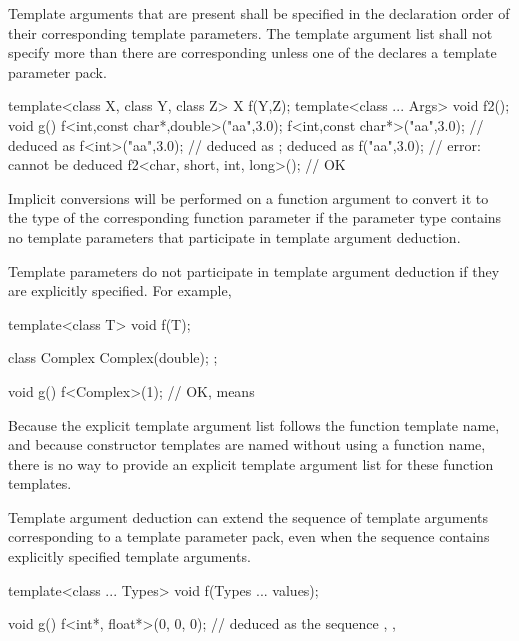 \pnum
Template arguments that are present shall be specified in the declaration
order of their corresponding template parameters.
The template argument list shall not specify more
than there are corresponding
unless one of the  declares a template
parameter pack.
\begin{example}
\begin{codeblock}
template<class X, class Y, class Z> X f(Y,Z);
template<class ... Args> void f2();
void g() {
  f<int,const char*,double>("aa",3.0);
  f<int,const char*>("aa",3.0); //  deduced as 
  f<int>("aa",3.0);             //  deduced as ;  deduced as 
  f("aa",3.0);                  // error:  cannot be deduced
  f2<char, short, int, long>(); // OK
}
\end{codeblock}
\end{example}

\pnum
Implicit conversions will be performed on a function argument
to convert it to the type of the corresponding function parameter if
the parameter type contains no template parameters
that participate in template argument deduction.
\begin{note}
Template parameters do not participate in template argument deduction if
they are explicitly specified.
For example,

\begin{codeblock}
template<class T> void f(T);

class Complex {
  Complex(double);
};

void g() {
  f<Complex>(1);    // OK, means 
}
\end{codeblock}
\end{note}

\pnum
\begin{note}
Because the explicit template argument list follows the function
template name, and because
constructor templates are named without using a
function name, there is no way to provide an explicit
template argument list for these function templates.
\end{note}

\pnum
Template argument deduction can extend the sequence of template
arguments corresponding to a template parameter pack, even when the
sequence contains explicitly specified template arguments.
\begin{example}
\begin{codeblock}
template<class ... Types> void f(Types ... values);

void g() {
  f<int*, float*>(0, 0, 0);     //  deduced as the sequence , , 
}
\end{codeblock}
\end{example}

